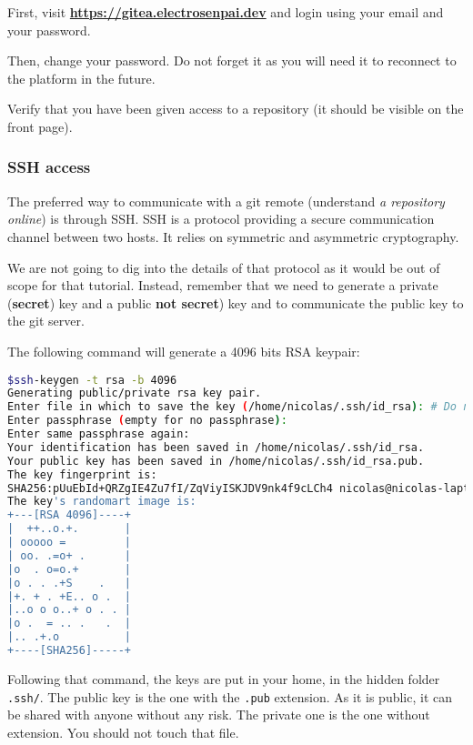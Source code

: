 \documentclass[12pt]{article}
\let\oldhref\href
\renewcommand{\href}[2]{\oldhref{#1}{\bfseries#2}}
\begin{document}
First, visit \href{https://gitea.electrosenpai.dev}{https://gitea.electrosenpai.dev} and login using your email and your password.

Then, change your password. Do not forget it as you will need it to reconnect to the platform in the future.

Verify that you have been given access to a repository (it should be visible on the front page).

\subsubsection{SSH access}

The preferred way to communicate with a git remote (understand \textit{a repository online}) is through SSH. SSH is a protocol providing a secure communication channel between two hosts. It relies on symmetric and asymmetric cryptography.

We are not going to dig into the details of that protocol as it would be out of scope for that tutorial. Instead, remember that we need to generate a private (\textbf{secret}) key and a public \textbf{not secret}) key and to communicate the public key to the git server.

The following command will generate a 4096 bits RSA keypair:

\begin{lstlisting}[language=bash]
$ssh-keygen -t rsa -b 4096
Generating public/private rsa key pair.
Enter file in which to save the key (/home/nicolas/.ssh/id_rsa): # Do not put anything here, it is the right place
Enter passphrase (empty for no passphrase): 
Enter same passphrase again:
Your identification has been saved in /home/nicolas/.ssh/id_rsa.
Your public key has been saved in /home/nicolas/.ssh/id_rsa.pub.
The key fingerprint is:
SHA256:pUuEbId+QRZgIE4Zu7fI/ZqViyISKJDV9nk4f9cLCh4 nicolas@nicolas-laptop
The key's randomart image is:
+---[RSA 4096]----+
|  ++..o.+.       |
| ooooo =         |
| oo. .=o+ .      |
|o  . o=o.+       |
|o . . .+S    .   |
|+. + . +E.. o .  |
|..o o o..+ o . . |
|o .  = .. .   .  |
|.. .+.o          |
+----[SHA256]-----+
\end{lstlisting}

Following that command, the keys are put in your home, in the hidden folder \texttt{.ssh/}. The public key is the one with the \texttt{.pub} extension. As it is public, it can be shared with anyone without any risk. The private one is the one without extension. You should not touch that file.
\end{document}
